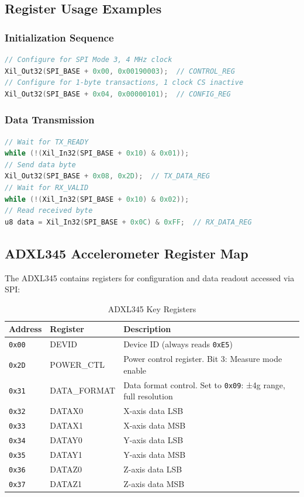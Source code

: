 \documentclass[11pt,a4paper]{article}
\begin{document}
\subsection{Register Usage Examples}

\subsubsection{Initialization Sequence}
\begin{lstlisting}[language=C, caption=SPI Master Initialization]
// Configure for SPI Mode 3, 4 MHz clock
Xil_Out32(SPI_BASE + 0x00, 0x00190003);  // CONTROL_REG
// Configure for 1-byte transactions, 1 clock CS inactive
Xil_Out32(SPI_BASE + 0x04, 0x00000101);  // CONFIG_REG
\end{lstlisting}

\subsubsection{Data Transmission}
\begin{lstlisting}[language=C, caption=SPI Transaction Example]
// Wait for TX_READY
while (!(Xil_In32(SPI_BASE + 0x10) & 0x01));
// Send data byte
Xil_Out32(SPI_BASE + 0x08, 0x2D);  // TX_DATA_REG
// Wait for RX_VALID
while (!(Xil_In32(SPI_BASE + 0x10) & 0x02));
// Read received byte
u8 data = Xil_In32(SPI_BASE + 0x0C) & 0xFF;  // RX_DATA_REG
\end{lstlisting}

\subsection{ADXL345 Accelerometer Register Map}

The ADXL345 contains registers for configuration and data readout accessed via SPI:

\begin{table}[H]
\centering
\caption{ADXL345 Key Registers}
\label{tab:adxl345_registers}
\begin{tabular}{@{}llp{8cm}@{}}
\toprule
\textbf{Address} & \textbf{Register} & \textbf{Description} \\ \midrule
\texttt{0x00} & DEVID & Device ID (always reads \texttt{0xE5}) \\
\texttt{0x2D} & POWER\_CTL & Power control register. Bit 3: Measure mode enable \\
\texttt{0x31} & DATA\_FORMAT & Data format control. Set to \texttt{0x09}: ±4g range, full resolution \\
\texttt{0x32} & DATAX0 & X-axis data LSB \\
\texttt{0x33} & DATAX1 & X-axis data MSB \\
\texttt{0x34} & DATAY0 & Y-axis data LSB \\
\texttt{0x35} & DATAY1 & Y-axis data MSB \\
\texttt{0x36} & DATAZ0 & Z-axis data LSB \\
\texttt{0x37} & DATAZ1 & Z-axis data MSB \\ \bottomrule
\end{tabular}
\end{table}
\end{document}
